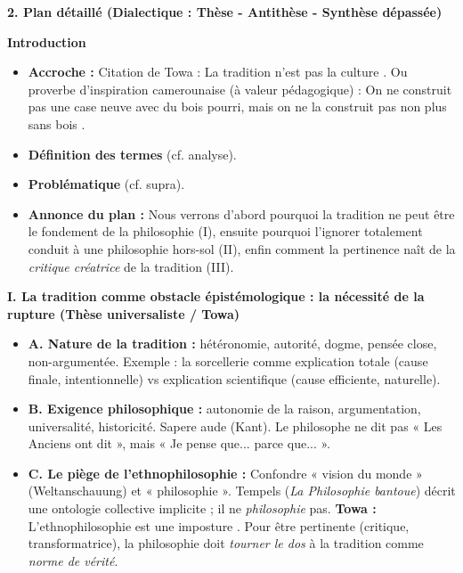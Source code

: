 \documentclass[11pt]{article}
\begin{document}
\begin{exoresolu}
\textbf{2. Plan détaillé (Dialectique : Thèse - Antithèse - Synthèse dépassée)}

\textbf{Introduction}
\begin{itemize}
    \item \textbf{Accroche :} Citation de Towa : \guillemotleft La tradition n'est pas la culture \guillemotright. Ou proverbe d'inspiration camerounaise (à valeur pédagogique) : \guillemotleft On ne construit pas une case neuve avec du bois pourri, mais on ne la construit pas non plus sans bois \guillemotright.
    \item \textbf{Définition des termes} (cf. analyse).
    \item \textbf{Problématique} (cf. supra).
    \item \textbf{Annonce du plan :} Nous verrons d'abord pourquoi la tradition ne peut être le fondement de la philosophie (I), ensuite pourquoi l'ignorer totalement conduit à une philosophie hors-sol (II), enfin comment la pertinence naît de la \emph{critique créatrice} de la tradition (III).
\end{itemize}

\textbf{I. La tradition comme obstacle épistémologique : la nécessité de la rupture (Thèse universaliste / Towa)}
\begin{itemize}
    \item \textbf{A. Nature de la tradition :} hétéronomie, autorité, dogme, pensée close, non-argumentée. Exemple : la sorcellerie comme explication totale (cause finale, intentionnelle) vs explication scientifique (cause efficiente, naturelle).
    \item \textbf{B. Exigence philosophique :} autonomie de la raison, argumentation, universalité, historicité. \guillemotleft Sapere aude \guillemotright (Kant). Le philosophe ne dit pas « Les Anciens ont dit », mais « Je pense que... parce que... ».
    \item \textbf{C. Le piège de l'ethnophilosophie :} Confondre « vision du monde » (Weltanschauung) et « philosophie ». Tempels (\emph{La Philosophie bantoue}) décrit une ontologie collective implicite ; il ne \emph{philosophie} pas. \textbf{Towa :} \guillemotleft L'ethnophilosophie est une imposture \guillemotright. Pour être pertinente (critique, transformatrice), la philosophie doit \emph{tourner le dos} à la tradition comme \emph{norme de vérité}.
\end{itemize}


\end{exoresolu}
\end{document}
